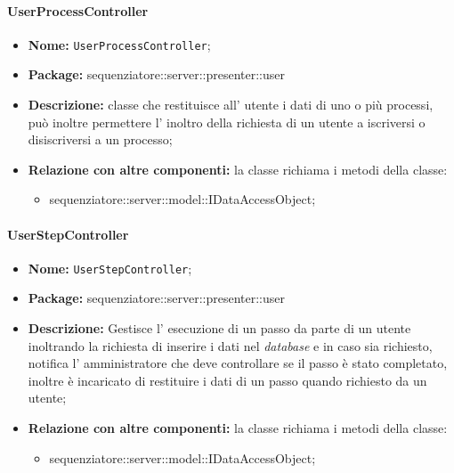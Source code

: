 \paragraph{UserProcessController}
	\begin{itemize}
		\item \textbf{Nome:} \texttt{UserProcessController};
		\item \textbf{Package:} sequenziatore::server::presenter::user
		\item \textbf{Descrizione:} classe che restituisce all' utente i dati di uno o più processi, può inoltre permettere l' inoltro della richiesta di un utente a iscriversi o disiscriversi a un processo;
		\item \textbf{Relazione con altre componenti:} la classe richiama i metodi della classe:
		\begin{itemize}
			\item sequenziatore::server::model::IDataAccessObject;
		\end{itemize}
	\end{itemize}
\paragraph{UserStepController}
	\begin{itemize}
		\item \textbf{Nome:} \texttt{UserStepController};
		\item \textbf{Package:} sequenziatore::server::presenter::user
		\item \textbf{Descrizione:} Gestisce l' esecuzione di un passo da parte di un utente inoltrando la richiesta di inserire i dati nel \textit{database} e in caso sia richiesto, notifica l' amministratore che deve controllare se il passo è stato completato, inoltre è incaricato di restituire i dati di un passo quando richiesto da un utente;
		\item \textbf{Relazione con altre componenti:} la classe richiama i metodi della classe:
		\begin{itemize}
			\item sequenziatore::server::model::IDataAccessObject;
		\end{itemize}
	\end{itemize}
